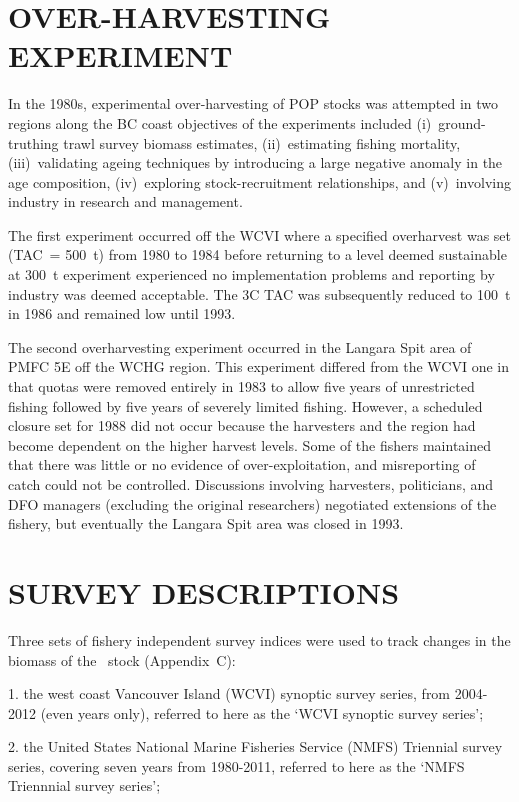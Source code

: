 \section{OVER-HARVESTING EXPERIMENT}

In the 1980s, experimental over-harvesting of POP stocks was attempted in two regions along the BC coast  objectives of the experiments included (i)~ground-truthing trawl survey biomass estimates, (ii)~estimating fishing mortality, (iii)~validating ageing techniques by introducing a large negative anomaly in the age composition, (iv)~exploring stock-recruitment relationships, and (v)~involving industry in research and management.

The first experiment occurred off the WCVI where a specified overharvest was set (TAC~= 500~t) from 1980 to 1984 before returning to a level deemed sustainable at 300~t  experiment experienced no implementation problems and reporting by industry was deemed acceptable. The 3C TAC was subsequently reduced to 100~t in 1986 and remained low until 1993. 

The second overharvesting experiment occurred in the Langara Spit area of PMFC 5E off the WCHG region. This experiment differed from the WCVI one in that quotas were removed entirely in 1983 to allow five years of unrestricted fishing followed by five years of severely limited fishing. However, a scheduled closure set for 1988 did not occur because the harvesters and the region had become dependent on the higher harvest levels. Some of the fishers maintained that there was little or no evidence of over-exploitation, and misreporting of catch could not be controlled. Discussions involving harvesters, politicians, and DFO managers (excluding the original researchers) negotiated extensions of the fishery, but eventually the Langara Spit area was closed in 1993.

\section{SURVEY DESCRIPTIONS}

Three sets of fishery independent survey indices were used to track changes in the biomass of the \area~stock (Appendix~C):

1. the west coast Vancouver Island (WCVI) synoptic survey series, from 2004-2012 (even years only), referred to here as the `WCVI synoptic survey series';

2. the United States National Marine Fisheries Service (NMFS) Triennial survey series, covering seven years from 1980-2011, referred to here as the `NMFS Triennnial survey series';

